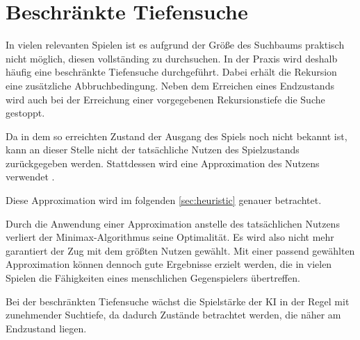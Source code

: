 \section{Beschränkte Tiefensuche}

In vielen relevanten Spielen ist es aufgrund der Größe des Suchbaums praktisch nicht möglich, diesen vollständing zu
durchsuchen. In der Praxis wird deshalb häufig eine beschränkte Tiefensuche durchgeführt. Dabei erhält die Rekursion
eine zusätzliche Abbruchbedingung. Neben dem Erreichen eines Endzustands wird auch bei der Erreichung einer
vorgegebenen Rekursionstiefe die Suche gestoppt.

Da in dem so erreichten Zustand der Ausgang des Spiels noch nicht bekannt ist, kann an dieser Stelle nicht der
tatsächliche Nutzen des Spielzustands zurückgegeben werden. Stattdessen wird eine Approximation des Nutzens verwendet \cite[S.~171]{ai2010russel}.

Diese Approximation wird im folgenden \autoref{sec:heuristic} genauer betrachtet.

Durch die Anwendung einer Approximation anstelle des tatsächlichen Nutzens verliert der Minimax-Algorithmus seine
Optimalität. Es wird also nicht mehr garantiert der Zug mit dem größten Nutzen gewählt. Mit einer passend gewählten
Approximation können dennoch gute Ergebnisse erzielt werden, die in vielen Spielen die Fähigkeiten eines menschlichen
Gegenspielers übertreffen.

Bei der beschränkten Tiefensuche wächst die Spielstärke der \ac{KI} in der Regel mit zunehmender Suchtiefe, da dadurch
Zustände betrachtet werden, die näher am Endzustand liegen.

